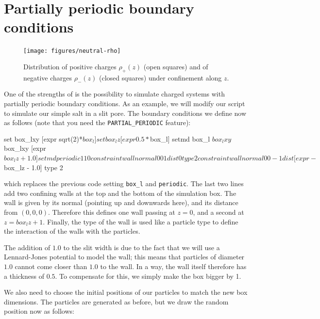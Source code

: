 \documentclass[
a4paper,                        %
11pt,                           %
twoside,                        %
footsepline,                    %
headsepline,                    %
headexclude,                    %
footexclude,                    %
pagesize,                       %
]{scrartcl}
\begin{document}
\section{Partially periodic boundary conditions}

\begin{figure}[t]
  \centering
  \texttt{[image: figures/neutral-rho]}
  \caption{Distribution of positive charges $\rho_+(z)$ (open squares)
    and of negative charges $\rho_-(z)$ (closed squares) under
    confinement along $z$.}
  \label{fig:neutralrho}
\end{figure}

One of the strengths of \es{} is the possibility to simulate charged
systems with partially periodic boundary conditions. As an example, we
will modify our script to simulate our simple salt in a slit pore. The
boundary conditions we define now as follows (note that you need the
\verb|PARTIAL_PERIODIC| feature):

\begin{tclcode}
  set box_lxy [expr sqrt(2)*$box_l]
  set box_lz  [expr 0.5*$box_l]
  setmd box_l $box_lxy $box_lxy [expr $box_lz + 1.0]
  setmd periodic 1 1 0
  constraint wall normal 0 0  1 dist 0 type 2
  constraint wall normal 0 0 -1 dist [expr -$box_lz - 1.0] type 2
\end{tclcode}

which replaces the previous code setting \verb|box_l| and
\verb|periodic|. The last two lines add two confining walls at the top
and the bottom of the simulation box. The wall is given by its normal
(pointing up and downwards here), and its distance from
$(0,0,0)$. Therefore this defines one wall passing at $z=0$, and a
second at $z=box_lz+1$. Finally, the type of the wall is used like a
particle type to define the interaction of the walls with the particles.

The addition of $1.0$ to the slit width is due to the fact that we will
use a Lennard-Jones potential to model the wall; this means that
particles of diameter $1.0$ cannot come closer than $1.0$ to the wall. In a
way, the wall itself therefore has a thickness of $0.5$. To compensate
for this, we simply make the box bigger by 1.

We also need to choose the initial positions of our particles to match
the new box dimensions. The particles are generated as before, but we
draw the random position now as follows:

\end{document}
